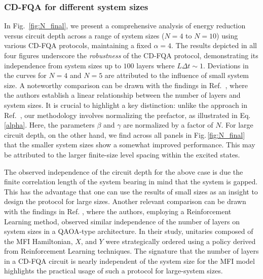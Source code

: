 \documentclass[twocolumn,aps,superscriptaddress,floatfix,longbibliography]{revtex4-2}
\newcommand{\awx}[1]{{\color[rgb]{.8,.6,.6}{\sout{#1}}}}
\newcommand{\Eq}[1]{Eq.\,\eqref{#1}}
\newcommand{\Fig}[1]{Fig.\,\ref{fig:#1}}
\begin{document}
\subsubsection{CD-FQA for different system sizes}
In Fig.~\ref{fig:N_final}, we present a comprehensive analysis of energy reduction versus circuit depth across a range of system sizes ($N=4$ to $N=10$) using various CD-FQA protocols, maintaining a fixed $\alpha=4$. The results depicted in all four figures underscore the \textit{robustness} of the CD-FQA protocol, demonstrating its independence from system sizes up to $100$ layers where $L\Delta t\sim 1$. Deviations in the curves for $N=4$ and $N=5$ are attributed to the influence of small system size. A noteworthy comparison can be drawn with the findings in Ref.~\cite{FeedbackPRL}, where the authors establish a linear relationship between the number of layers and system sizes. It is crucial to highlight a key distinction: unlike the approach in Ref.~\cite{FeedbackPRL}, our methodology involves normalizing the prefactor, as illustrated in \Eq{alpha}. Here, the parameters $\beta$ and $\gamma$ are normalized by a factor of $N$. 
For large circuit depth, %
on the other hand,
we find across all panels in \Fig{N_final}
that the smaller system sizes show a somewhat
improved performance. This may be attributed
to the larger finite-size level spacing within
the excited states.

The observed  
independence of the circuit depth for the above case is due the finite correlation length of the system
bearing in mind that the system is gapped. This 
has the advantage that
one can use the results of small sizes as an insight to design the protocol for large sizes.
Another relevant
comparison can be drawn with the findings in Ref. \cite{yao2021reinforcement}, where the authors, employing a
Reinforcement Learning method, observed similar independence of the number of layers on system sizes in a QAOA-type
architecture. In their study, unitaries composed of the MFI
Hamiltonian, $X$, and $Y$ were strategically ordered using a
policy derived from Reinforcement Learning techniques. The signature that the number of layers in a CD-FQA circuit is
nearly independent of the system size for the MFI model highlights the practical usage of such a protocol for large-system sizes. 
\end{document}
